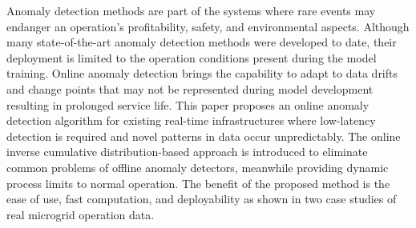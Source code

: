 Anomaly detection methods are part of the systems where rare events may endanger an operation's profitability, safety, and environmental aspects. Although many state-of-the-art anomaly detection methods were developed to date, their deployment is limited to the operation conditions present during the model training. Online anomaly detection brings the capability to adapt to data drifts and change points that may not be represented during model development resulting in prolonged service life. This paper proposes an online anomaly detection algorithm for existing real-time infrastructures where low-latency detection is required and novel patterns in data occur unpredictably. The online inverse cumulative distribution-based approach is introduced to eliminate common problems of offline anomaly detectors, meanwhile providing dynamic process limits to normal operation. The benefit of the proposed method is the ease of use, fast computation, and deployability as shown in two case studies of real microgrid operation data.